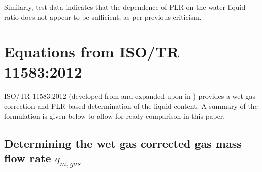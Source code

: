 \documentclass[journal]{IEEEtran}
\begin{document}
Similarly, test data indicates that the dependence of \acrshort{PLR} on the water-liquid ratio does not appear to be sufficient, as per previous criticism.

\glsnogroupskiptrue
\printglossary[type=\acronymtype,nonumberlist,title=Glossary of Terms]



\vfill\eject

%
\appendices
\section{Equations from ISO/TR 11583:2012} \label{11583 Equations}

ISO/TR 11583:2012\cite{2012ISO/TRConduits} (developed from \cite{Reader-Harris2009} and expanded upon in \cite{Reader-Harris2015}) provides a wet gas correction and \acrshort{PLR}-based determination of the liquid content.  A summary of the formulation is given below to allow for ready comparison in this paper.

\subsection{Determining the wet gas corrected gas mass flow rate $q_{m,gas}$}
\end{document}
